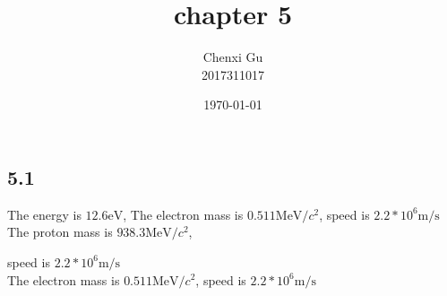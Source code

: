 \documentclass{article}
\begin{document}
\begin{CJK*}{GBK}{song}

\pagestyle{fancy}  
\fancyhead{} %
\renewcommand{\headrulewidth}{0.4pt}  
\renewcommand{\footrulewidth}{0.4pt} 



\title {chapter 5}
\author{Chenxi Gu\\2017311017}

\date{\today}

\maketitle
\section{5.1}
The energy is $12.6\text{eV}$,
The electron mass is $0.511\text{MeV/$c^2$}$, speed is $2.2*10^6\text{m/s}$\\

The proton mass is $938.3\text{MeV/$c^2$}$, 

speed is $2.2*10^6\text{m/s}$\\
The electron mass is $0.511\text{MeV/$c^2$}$, speed is $2.2*10^6\text{m/s}$\\


\end{CJK*}
\end{document}
